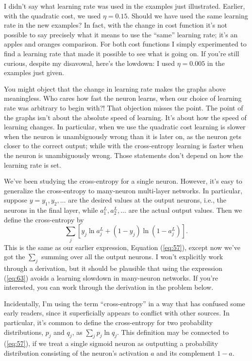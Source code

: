 \documentclass[a4paper,twoside,10pt]{book}
\begin{document}
I didn't say what learning rate was used in the examples just illustrated. Earlier, with the quadratic cost, we used $\eta=0.15$. Should we have used the same learning rate in the new examples? In fact, with the change in cost function it's not possible to say precisely what it means to use the ``same'' learning rate; it's an apples and oranges comparison. For both cost functions I simply experimented to find a learning rate that made it possible to see what is going on. If you're still curious, despite my disavowal, here's the lowdown: I used $\eta=0.005$ in the examples just given.

You might object that the change in learning rate makes the graphs above meaningless. Who cares how fast the neuron learns, when our choice of learning rate was arbitrary to begin with?! That objection misses the point. The point of the graphs isn't about the absolute speed of learning. It's about how the speed of learning changes. In particular, when we use the quadratic cost learning is slower when the neuron is unambiguously wrong than it is later on, as the neuron gets closer to the correct output; while with the cross-entropy learning is faster when the neuron is unambiguously wrong. Those statements don't depend on how the learning rate is set.

We've been studying the cross-entropy for a single neuron. However, it's easy to generalize the cross-entropy to many-neuron multi-layer networks. In particular, suppose $y=y_1,y_2,\ldots$ are the desired values at the output neurons, i.e., the neurons in the final layer, while $a^L_1,a^L_2,\ldots$ are the actual output values. Then we define the cross-entropy by
\begin{equation}
	\sum_j \left[y_j \ln a^L_j + (1-y_j) \ln (1-a^L_j) \right].
	\label{eq:63}
\end{equation}
This is the same as our earlier expression, Equation (\ref{eq:57}), except now we've got the $\sum_j$ summing over all the output neurons. I won't explicitly work through a derivation, but it should be plausible that using the expression (\ref{eq:63}) avoids a learning slowdown in many-neuron networks. If you're interested, you can work through the derivation in the problem below.

Incidentally, I'm using the term ``cross-entropy'' in a way that has confused some early readers, since it superficially appears to conflict with other sources. In particular, it's common to define the cross-entropy for two probability distributions, $p_j$ and $q_j$, as $\sum_jp_j\ln{}q_j$. This definition may be connected to (\ref{eq:57}), if we treat a single sigmoid neuron as outputting a probability distribution consisting of the neuron's activation $a$ and its complement $1-a$.
\end{document}
